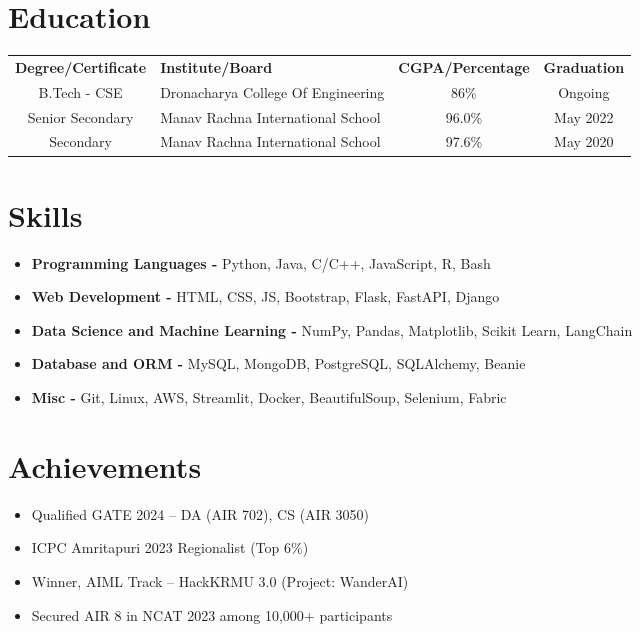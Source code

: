 \documentclass[a4paper,11pt]{article}
\begin{document}
\section{Education}
\vspace{-2mm}
\begin{tabularx}{\textwidth}{cYcc}
  \textbf{Degree/Certificate} & \textbf{Institute/Board} & \textbf{CGPA/Percentage} & \textbf{Graduation} \\
  B.Tech - CSE & Dronacharya College Of Engineering & 86\% & Ongoing \\
  Senior Secondary & Manav Rachna International School & 96.0\% & May 2022 \\
  Secondary & Manav Rachna International School & 97.6\% & May 2020 \\
\end{tabularx}

\section*{Skills}
\vspace{-2mm}
\begin{itemize}[left=0pt,itemsep=1pt,topsep=0pt,parsep=0pt]
    \item \textbf{Programming Languages -} Python, Java, C/C++, JavaScript, R, Bash
    \item \textbf{Web Development -} HTML, CSS, JS, Bootstrap, Flask, FastAPI, Django
    \item \textbf{Data Science and Machine Learning -} NumPy, Pandas, Matplotlib, Scikit Learn, LangChain
    \item \textbf{Database and ORM -} MySQL, MongoDB, PostgreSQL, SQLAlchemy, Beanie
    \item \textbf{Misc -} Git, Linux, AWS, Streamlit, Docker, BeautifulSoup, Selenium, Fabric
\end{itemize}

\section*{Achievements}
\vspace{-2mm}
\begin{itemize}[left=0pt,itemsep=1pt,topsep=0pt,parsep=0pt]
    \item Qualified GATE 2024 -- DA (AIR 702), CS (AIR 3050)
    \item ICPC Amritapuri 2023 Regionalist (Top 6\%)
    \item Winner, AIML Track -- HackKRMU 3.0 (Project: WanderAI)
    \item Secured AIR 8 in NCAT 2023 among 10,000+ participants
\end{itemize}
\end{document}
